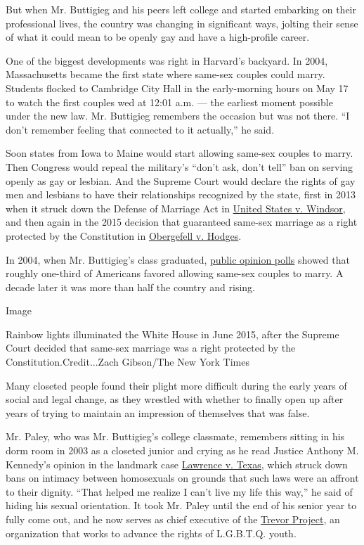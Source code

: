 But when Mr. Buttigieg and his peers left college and started embarking
on their professional lives, the country was changing in significant
ways, jolting their sense of what it could mean to be openly gay and
have a high-profile career.

One of the biggest developments was right in Harvard's backyard. In
2004, Massachusetts became the first state where same-sex couples could
marry. Students flocked to Cambridge City Hall in the early-morning
hours on May 17 to watch the first couples wed at 12:01 a.m. --- the
earliest moment possible under the new law. Mr. Buttigieg remembers the
occasion but was not there. ``I don't remember feeling that connected to
it actually,'' he said.

Soon states from Iowa to Maine would start allowing same-sex couples to
marry. Then Congress would repeal the military's ``don't ask, don't
tell'' ban on serving openly as gay or lesbian. And the Supreme Court
would declare the rights of gay men and lesbians to have their
relationships recognized by the state, first in 2013 when it struck down
the Defense of Marriage Act in
\href{https://www.oyez.org/cases/2012/12-307}{United States v. Windsor},
and then again in the 2015 decision that guaranteed same-sex marriage as
a right protected by the Constitution in
\href{https://www.oyez.org/cases/2014/14-556}{Obergefell v. Hodges}.

In 2004, when Mr. Buttigieg's class graduated,
\href{https://www.pewforum.org/fact-sheet/changing-attitudes-on-gay-marriage/}{public
opinion polls} showed that roughly one-third of Americans favored
allowing same-sex couples to marry. A decade later it was more than half
the country and rising.

Image

Rainbow lights illuminated the White House in June 2015, after the
Supreme Court decided that same-sex marriage was a right protected by
the Constitution.Credit...Zach Gibson/The New York Times

Many closeted people found their plight more difficult during the early
years of social and legal change, as they wrestled with whether to
finally open up after years of trying to maintain an impression of
themselves that was false.

Mr. Paley, who was Mr. Buttigieg's college classmate, remembers sitting
in his dorm room in 2003 as a closeted junior and crying as he read
Justice Anthony M. Kennedy's opinion in the landmark case
\href{https://www.oyez.org/cases/2002/02-102}{Lawrence v. Texas}, which
struck down bans on intimacy between homosexuals on grounds that such
laws were an affront to their dignity. ``That helped me realize I can't
live my life this way,'' he said of hiding his sexual orientation. It
took Mr. Paley until the end of his senior year to fully come out, and
he now serves as chief executive of the
\href{https://www.thetrevorproject.org/}{Trevor Project}, an
organization that works to advance the rights of L.G.B.T.Q. youth.

